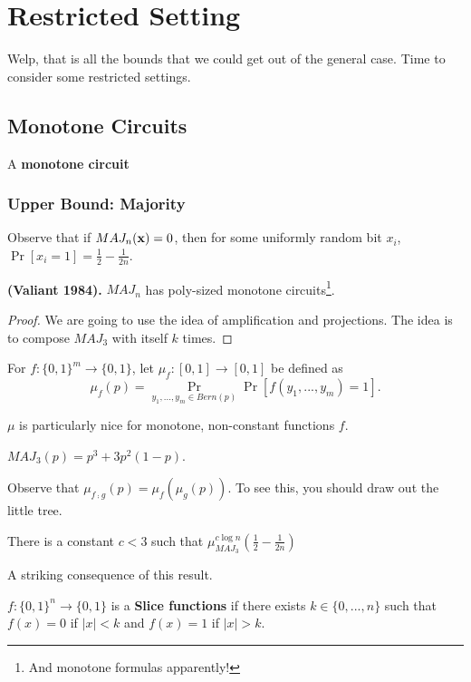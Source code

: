 \documentclass[11pt]{article}
\begin{document}
	\section{Restricted Setting}
	Welp, that is all the bounds that we could get out of the general case. Time to consider some restricted settings.
	
	\subsection{Monotone Circuits}
	\begin{definition}
		A \textbf{monotone circuit}
	\end{definition}
	
		\subsubsection{Upper Bound: Majority}
		Observe that if $MAJ_n(\mathbf{x}) = 0$, then for some uniformly random bit $x_i$, $\Pr[x_i = 1] = \frac{1}{2} - \frac{1}{2n}$.
		\begin{theorem}
			\textbf{(Valiant 1984).} $MAJ_n$ has poly-sized monotone circuits\footnote{And monotone formulas apparently!}.
		\end{theorem}
		\begin{proof}
			We are going to use the idea of amplification and projections. The idea is to compose $MAJ_3$ with itself $k$ times. 
		\end{proof}
		
		\begin{definition}
			For $f: \{0,1\}^m \rightarrow \{0,1\}$, let $\mu_f: [0,1] \rightarrow [0,1]$ be defined as
			\[\mu_f(p) = \Pr_{y_1, ..., y_m \in Bern(p)}\Pr[f(y_1, ..., y_m) = 1].\]
		\end{definition}
		$\mu$ is particularly nice for monotone, non-constant functions $f$. 
		
		\begin{example}
			$MAJ_3(p) = p^3 + 3p^2(1-p)$.
		\end{example}
		Observe that $\mu_{f \comp g}(p) = \mu_f(\mu_g(p))$. To see this, you should draw out the little tree. 
		
		\begin{lemma}
			There is a constant $c < 3$ such that $\mu_{MAJ_3}^{c\log n}\left(\frac{1}{2} - \frac{1}{2n}\right)$
		\end{lemma}
		
		A striking consequence of this result.
		\begin{definition}
			$f: \{0,1\}^n \rightarrow \{0,1\}$ is a \textbf{Slice functions} if there exists $k \in \{0, ..., n\}$ such that $f(x) = 0$ if $|x| < k$ and $f(x) = 1$ if $|x| > k$.
		\end{definition}
		
\end{document}
